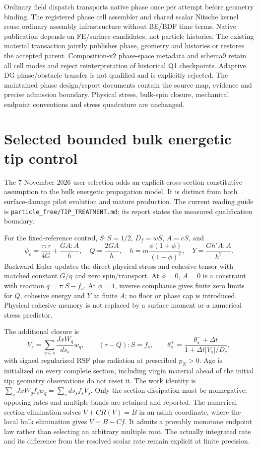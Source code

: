 \documentclass[11pt]{article}
\begin{document}
Ordinary field dispatch transports native phase once per attempt before geometry
binding. The registered phase cell assembler and shared scalar Nitsche kernel
reuse ordinary assembly infrastructure without BE/BDF time terms. Native
publication depends on FE/surface candidates, not particle histories.
The existing material transaction jointly publishes phase, geometry and histories
or restores the accepted parent. Composition-v2 phase-space metadata and schema9 retain all
cell modes and reject reinterpretation of historical Q1 checkpoints. Adaptive
DG phase/obstacle transfer is not qualified and is explicitly rejected.
The maintained phase design/report documents contain the source map, evidence
and precise admission boundary. Physical stress, bulk-spin closure, mechanical
endpoint conventions and stress quadrature are unchanged.


\section{Selected bounded bulk energetic tip control}
\label{sec:bulk-tip-sections}
The 7 November 2026 user selection adds an explicit cross-section constitutive
assumption to the bulk energetic propagation model. It is distinct from both
surface-damage pilot evolution and mature production. The current reading guide
is \texttt{particle\_free/TIP\_TREATMENT.md}; its report states the measured
qualification boundary.

For the fixed-reference control, $S:S=1/2$, $D_f=wS$, $A=eS$, and
\[
 \psi_e=\frac{\tau:\tau}{4G}+\frac{GA:A}{h},\quad Q=\frac{2GA}{h},\quad
 h=m\frac{\phi(1+\phi)}{(1-\phi)^2},\quad Y=\frac{G h'A:A}{h^2}.
\]
Backward Euler updates the direct physical stress and cohesive tensor with
matched constant $G/\eta$ and zero spin/transport. At $\phi=0$, $A=0$ is a
constraint with reaction $q=\tau:S-f_s$. At $\phi=1$, inverse compliance gives
finite zero limits for $Q$, cohesive energy and $Y$ at finite $A$; no floor or
phase cap is introduced. Physical cohesive memory is not replaced by a surface
moment or a numerical stress predictor.

The additional closure is
\[
 V_s=\sum_{q\in s}\frac{JxW_q}{ds_s}w_q,\qquad (\tau-Q):S=f_s,
 \qquad \theta_s^+=\frac{\theta_s^-+\Delta t}{1+\Delta t|V_s|/D_c},
\]
with signed regularized RSF plus radiation at prescribed $p_N>0$. Age is
initialized on every complete section, including virgin material ahead of the
initial tip; geometry observations do not reset it. The work identity is
$\sum_q JxW_q f_s w_q=\sum_s ds_s f_s V_s$. Only the section dissipation must
be nonnegative; opposing rates and multiple bands are retained and reported.
The numerical section elimination solves $V+C R(V)=B$ in an asinh coordinate,
where the local bulk elimination gives $V=B-Cf$. It admits a provably monotone
endpoint law rather than selecting an arbitrary multiple root. The actually
integrated rate and its difference from the resolved scalar rate remain explicit
at finite precision.
\end{document}
